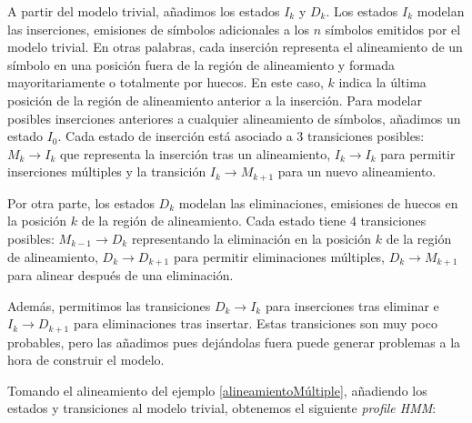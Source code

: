 A partir del modelo trivial, añadimos los estados $I_k$ y $D_k$. Los estados $I_k$ modelan las inserciones, emisiones de símbolos adicionales a los $n$ símbolos emitidos por el modelo trivial. En otras palabras, cada inserción representa el alineamiento de un símbolo en una posición fuera de la región de alineamiento y formada mayoritariamente o totalmente por huecos. En este caso, $k$ indica la última posición de la región de alineamiento anterior a la inserción. Para modelar posibles inserciones anteriores a cualquier alineamiento de símbolos, añadimos un estado $I_0$. Cada estado de inserción está asociado a $3$ transiciones posibles: $M_k\rightarrow I_k$ que representa la inserción tras un alineamiento, $I_k\rightarrow I_k$ para permitir inserciones múltiples y la transición $I_k\rightarrow M_{k+1}$ para un nuevo alineamiento. 

Por otra parte, los estados $D_k$ modelan las eliminaciones, emisiones de huecos en la posición $k$ de la región de alineamiento. Cada estado tiene $4$ transiciones posibles: $M_{k-1}\rightarrow D_k$ representando la eliminación en la posición $k$ de la región de alineamiento, $D_k \rightarrow D_{k+1}$ para permitir eliminaciones múltiples, $D_k\rightarrow M_{k+1}$ para alinear después de una eliminación. 

Además, permitimos las transiciones $D_k \rightarrow I_k$ para inserciones tras eliminar e $I_{k}\rightarrow D_{k+1}$ para eliminaciones tras insertar. Estas transiciones son muy poco probables, pero las añadimos pues dejándolas fuera puede generar problemas a la hora de construir el modelo.

Tomando el alineamiento del ejemplo \ref{alineamientoMúltiple}, añadiendo los estados y transiciones al modelo trivial, obtenemos el siguiente \textit{profile HMM}:

